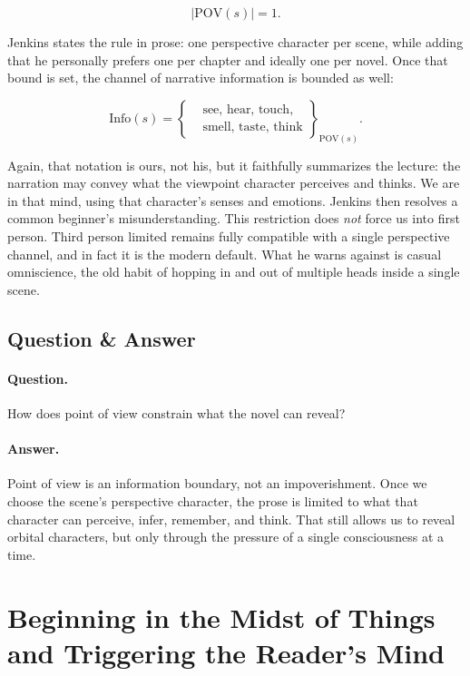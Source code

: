 \begin{equation}
|\mathrm{POV}(s)|=1.
\end{equation}

Jenkins states the rule in prose: one perspective character per scene, while adding that he personally prefers one per chapter and ideally one per novel. Once that bound is set, the channel of narrative information is bounded as well:

\begin{equation}
\mathrm{Info}(s)=
\left\{
\begin{aligned}
&\text{see, hear, touch,} \\
&\text{smell, taste, think}
\end{aligned}
\right\}_{\mathrm{POV}(s)}.
\end{equation}

Again, that notation is ours, not his, but it faithfully summarizes the lecture: the narration may convey what the viewpoint character perceives and thinks. We are in that mind, using that character's senses and emotions. Jenkins then resolves a common beginner's misunderstanding. This restriction does \emph{not} force us into first person. Third person limited remains fully compatible with a single perspective channel, and in fact it is the modern default. What he warns against is casual omniscience, the old habit of hopping in and out of multiple heads inside a single scene.

\subsection{Question \& Answer}

\paragraph{Question.} How does point of view constrain what the novel can reveal?

\paragraph{Answer.} Point of view is an information boundary, not an impoverishment. Once we choose the scene's perspective character, the prose is limited to what that character can perceive, infer, remember, and think. That still allows us to reveal orbital characters, but only through the pressure of a single consciousness at a time.

\section{Beginning in the Midst of Things and Triggering the Reader's Mind}

